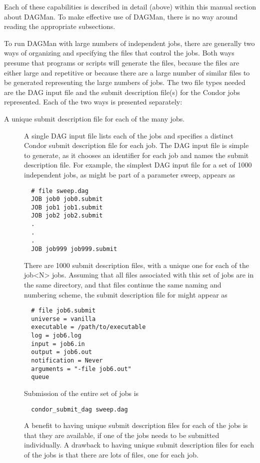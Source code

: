 Each of these capabilities is described in detail (above)
within this manual section about DAGMan.
To make effective use of DAGMan, there is no way around reading the 
appropriate subsections.

To run DAGMan with large numbers of independent jobs,
there are generally two ways of organizing and specifying the
files that control the jobs.
Both ways presume that programs or scripts will generate the files,
because the files are either large and repetitive
or because there are a large number of similar files to be
generated representing the large numbers of jobs.
The two file types needed are the DAG input file and the
submit description file(s) for the Condor jobs represented.
Each of the two ways is presented separately:

\begin{description}
\item[A unique submit description file for each of the many jobs.]
A single DAG input file lists each of the jobs and specifies
a distinct Condor submit description file for each job.
The DAG input file is simple to generate, as it chooses an
identifier for each job and names the submit description file.
For example, the simplest DAG input file for a set of 1000 independent jobs,
as might be part of a parameter sweep, appears as
\begin{verbatim}
  # file sweep.dag
  JOB job0 job0.submit
  JOB job1 job1.submit
  JOB job2 job2.submit
  .
  .
  .
  JOB job999 job999.submit
\end{verbatim}
There are 1000 submit description files, with a unique one for
each of the job<N> jobs.
Assuming that all files associated with this set of jobs are in the
same directory, and that files continue the same naming and numbering
scheme, the submit description file for 
might appear as
\begin{verbatim}
  # file job6.submit
  universe = vanilla
  executable = /path/to/executable
  log = job6.log
  input = job6.in
  output = job6.out
  notification = Never
  arguments = "-file job6.out"
  queue
\end{verbatim}

Submission of the entire set of jobs is
\begin{verbatim}
  condor_submit_dag sweep.dag
\end{verbatim}

A benefit to having unique submit description files for each of the
jobs is that they are available, if one of the jobs needs to be
submitted individually.
A drawback to having unique submit description files for each of the jobs
is that there are lots of files, one for each job.


\end{description}
